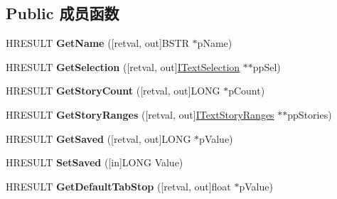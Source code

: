 \subsection*{Public 成员函数}
\begin{DoxyCompactItemize}
\item 
\mbox{\label{interface_i_text_document_a086ab408aa6b6a4987012cfd73c5cda4}} 
H\+R\+E\+S\+U\+LT {\bfseries Get\+Name} (\mbox{[}retval, out\mbox{]}B\+S\+TR $\ast$p\+Name)
\item 
\mbox{\label{interface_i_text_document_abd088a05f895df6def717503e7640019}} 
H\+R\+E\+S\+U\+LT {\bfseries Get\+Selection} (\mbox{[}retval, out\mbox{]}\hyperlink{interface_i_text_selection}{I\+Text\+Selection} $\ast$$\ast$pp\+Sel)
\item 
\mbox{\label{interface_i_text_document_ac7c895b9279129c71241e49b937fbb12}} 
H\+R\+E\+S\+U\+LT {\bfseries Get\+Story\+Count} (\mbox{[}retval, out\mbox{]}L\+O\+NG $\ast$p\+Count)
\item 
\mbox{\label{interface_i_text_document_aca191218b392720f1c45fad89e655e3a}} 
H\+R\+E\+S\+U\+LT {\bfseries Get\+Story\+Ranges} (\mbox{[}retval, out\mbox{]}\hyperlink{interface_i_text_story_ranges}{I\+Text\+Story\+Ranges} $\ast$$\ast$pp\+Stories)
\item 
\mbox{\label{interface_i_text_document_ac658387a7e50cf4c14e1840f2e337bad}} 
H\+R\+E\+S\+U\+LT {\bfseries Get\+Saved} (\mbox{[}retval, out\mbox{]}L\+O\+NG $\ast$p\+Value)
\item 
\mbox{\label{interface_i_text_document_a92ef69b4da03753cf36984c413c212b2}} 
H\+R\+E\+S\+U\+LT {\bfseries Set\+Saved} (\mbox{[}in\mbox{]}L\+O\+NG Value)
\item 
\mbox{\label{interface_i_text_document_a68d55b1e702f1886e4745d7129cf91b9}} 
H\+R\+E\+S\+U\+LT {\bfseries Get\+Default\+Tab\+Stop} (\mbox{[}retval, out\mbox{]}float $\ast$p\+Value)
\item 
\mbox{\label{interface_i_text_document_a8d2850c03678263497bcdf66e19b5a91}} 

\end{DoxyCompactItemize}
